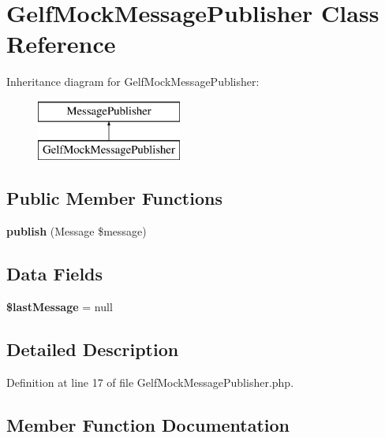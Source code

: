 \section{Gelf\+Mock\+Message\+Publisher Class Reference}
\label{class_monolog_1_1_handler_1_1_gelf_mock_message_publisher}
Inheritance diagram for Gelf\+Mock\+Message\+Publisher\+:\begin{figure}[H]
\begin{center}
\leavevmode
\includegraphics[height=2.000000cm]{class_monolog_1_1_handler_1_1_gelf_mock_message_publisher}
\end{center}
\end{figure}
\subsection*{Public Member Functions}
\begin{DoxyCompactItemize}
\item 
{\bf publish} (Message \$message)
\end{DoxyCompactItemize}
\subsection*{Data Fields}
\begin{DoxyCompactItemize}
\item 
{\bf \$last\+Message} = null
\end{DoxyCompactItemize}


\subsection{Detailed Description}


Definition at line 17 of file Gelf\+Mock\+Message\+Publisher.\+php.



\subsection{Member Function Documentation}
